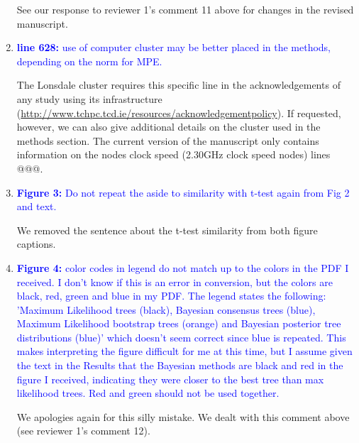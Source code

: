 \documentclass[12pt,letterpaper]{article}
\begin{document}
\begin{enumerate}
See our response to reviewer 1's comment 11 above for changes in the revised manuscript.

\item{\textcolor{blue}{\textbf{line 628:} use of computer cluster may be better placed in the methods, depending on the norm for MPE.}}

The Lonsdale cluster requires this specific line in the acknowledgements of any study using its infrastructure (\url{http://www.tchpc.tcd.ie/resources/acknowledgementpolicy}).
If requested, however, we can also give additional details on the cluster used in the methods section.
The current version of the manuscript only contains information on the nodes clock speed (2.30GHz clock speed nodes) lines @@@.

\item{\textcolor{blue}{\textbf{Figure 3:} Do not repeat the aside to similarity with t-test again from Fig 2 and text.}}

We removed the sentence about the t-test similarity from both figure captions.

\item{\textcolor{blue}{\textbf{Figure 4:} color codes in legend do not match up to the colors in the PDF I received. I don't know if this is an error in conversion, but the colors are black, red, green and blue in my PDF. The legend states the following: 'Maximum Likelihood trees (black), Bayesian consensus trees (blue), Maximum Likelihood bootstrap trees (orange) and Bayesian posterior tree distributions (blue)' which doesn't seem correct since blue is repeated. This makes interpreting the figure difficult for me at this time, but I assume given the text in the Results that the Bayesian methods are black and red in the figure I received, indicating they were closer to the best tree than max likelihood trees. Red and green should not be used together.}}

We apologies again for this silly mistake. We dealt with this comment above (see reviewer 1's comment 12).


\end{enumerate}
\end{document}

